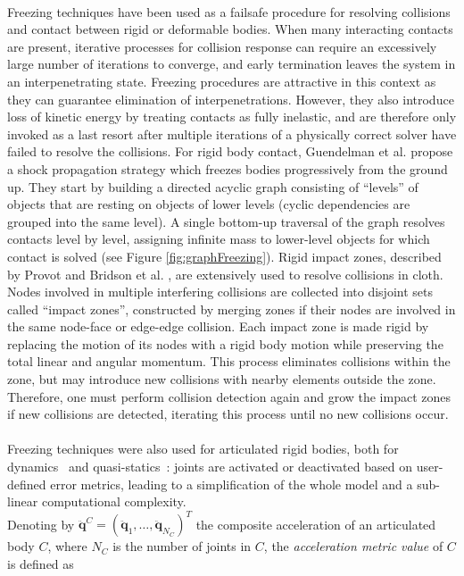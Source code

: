 \\
Freezing techniques have been used as a failsafe procedure for resolving collisions and contact between rigid or deformable bodies.
When many interacting contacts are present, iterative processes for collision response can require an excessively large number of iterations to converge, and early termination leaves the system in an interpenetrating state.
Freezing procedures are attractive in this context as they can guarantee elimination of interpenetrations.
However, they also introduce loss of kinetic energy by treating contacts as fully inelastic, and are therefore only invoked as a last resort after multiple iterations of a physically correct solver have failed to resolve the collisions.
For rigid body contact, Guendelman et al. \cite{Guendelman2003} propose a shock propagation strategy which freezes bodies progressively from the ground up.
They start by building a directed acyclic graph consisting of ``levels'' of objects that are resting on objects of lower levels (cyclic dependencies are grouped into the same level).
A single bottom-up traversal of the graph resolves contacts level by level, assigning infinite mass to lower-level objects for which contact is solved (see Figure \ref{fig:graphFreezing}).
Rigid impact zones, described by Provot \cite{Provot1997} and Bridson et al. \cite{Bridson2002}, are extensively used to resolve collisions in cloth.
Nodes involved in multiple interfering collisions are collected into disjoint sets called ``impact zones'', constructed by merging zones if their nodes are involved in the same node-face or edge-edge collision.
Each impact zone is made rigid by replacing the motion of its nodes with a rigid body motion while preserving the total linear and angular momentum.
This process eliminates collisions within the zone, but may introduce new collisions with nearby elements outside the zone.
Therefore, one must perform collision detection again and grow the impact zones if new collisions are detected, iterating this process until no new collisions occur.
\\ \\
Freezing techniques were also used for articulated rigid bodies, both for dynamics~\cite{Redon2005} and quasi-statics~\cite{Redon2006}: joints are activated or deactivated based on user-defined error metrics, leading to a simplification of the whole model and a sub-linear computational complexity.
\\
Denoting by $\mathbf{\ddot{q}}^C=(\mathbf{\ddot{q}}_1,\ldots,\mathbf{\ddot{q}}_{N_C})^T$
the composite acceleration of an articulated body $C$, where $N_C$ is the number of joints in $C$, the \emph{acceleration
metric value} of $C$ is defined as
